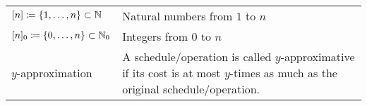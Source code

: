 \begin{table}[H]
\begin{tabularx}{\textwidth}{ | >{\centering\arraybackslash}X | >{\arraybackslash}m{} | }
  \hline \multicolumn{2}{|c|}{\textbf{\large Miscellaneous}} \\  
  \hline $[n]\coloneqq\{1,\dotsc,n\}\subset\mathbb{N}$&Natural numbers from $1$ to $n$\\
  \hline $[n]_0\coloneqq\{0,\dotsc,n\}\subset\mathbb{N}_0$&Integers from $0$ to $n$\\
  \hline $y$-approximation&A schedule/operation is called $y$-approximative if its cost is at most $y$-times as much as the original schedule/operation.\\
  \hline
\end{tabularx}
\end{table}
